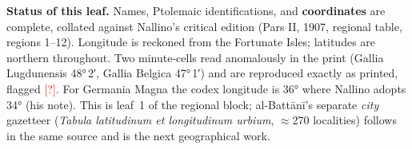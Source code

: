 \documentclass[11pt,a4paper]{article}
\newcommand{\CHECK}{\textcolor{red}{\small[?]}}
\begin{document}
\noindent\small\textbf{Status of this leaf.} Names, Ptolemaic identifications, and \textbf{coordinates}
are complete, collated against Nallino's critical edition (Pars II, 1907, regional table, regions 1--12).
Longitude is reckoned from the Fortunate Isles; latitudes are northern throughout. Two minute-cells read
anomalously in the print (Gallia Lugdunensis 48°\,2′, Gallia Belgica 47°\,1′) and are reproduced exactly
as printed, flagged \CHECK. For Germania Magna the codex longitude is 36° where Nallino adopts 34°
(his note). This is leaf~1 of the regional block; al-Battānī's separate \emph{city} gazetteer
(\textit{Tabula latitudinum et longitudinum urbium}, $\approx$270 localities) follows in the same source
and is the next geographical work.
\end{document}

